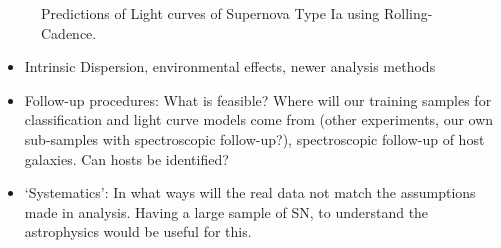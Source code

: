 \begin{figure}[tbh!]
\vskip -1.3in
\vskip -1.3in
\caption{Predictions of Light curves of Supernova Type Ia using Rolling-Cadence.
}
\label{fig:SNIaLCopsimmainnew}
\end{figure}



\begin{itemize}
\item Intrinsic Dispersion, environmental effects, newer analysis methods
\item Follow-up procedures: What is feasible? Where will our training samples for classification and light curve models come from (other experiments, our own 
sub-samples with spectroscopic follow-up?), spectroscopic follow-up of host galaxies. Can hosts be identified?
\item `Systematics': In what ways will the real data not match the assumptions made in analysis. Having a large sample of SN, to understand the astrophysics would be useful for this. 
\end{itemize}



\navigationbar
